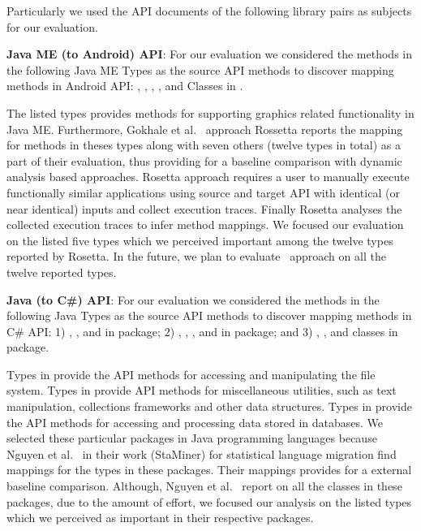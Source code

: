 Particularly we used the API documents of the following library pairs as subjects for our evaluation. 


\textbf{Java ME (to Android) API}:
For our evaluation we considered the methods in the following Java ME Types as the source API methods to discover mapping methods in Android API: 
,
,
,
, and
Classes in   .


The listed types provides methods for supporting graphics related functionality in Java ME.
Furthermore, Gokhale et al.~\cite{Gokhale2013ICSE} approach Rossetta reports the
mapping for methods in theses types along with seven others (twelve types in total) as a part of their evaluation,
thus providing for a baseline comparison with dynamic analysis based approaches.
Rosetta approach requires a user to manually execute functionally similar applications using source and target API with identical (or near identical) inputs and collect execution traces.
Finally Rosetta analyses the collected execution traces to infer method mappings.
We focused our evaluation on the listed five types which we perceived important among the twelve types reported by Rosetta.
In the future, we plan to evaluate \tool\ approach on all the twelve reported types. 

\textbf{Java (to C\#) API}:
For our evaluation we considered the methods in the following Java Types as the source API methods to discover mapping methods in C\# API: 
1) ,
, and 
 in  package;
2) ,
,
, and 
 in  package; and
3) ,
, and 
 classes in  package.
 
Types in  provide the API methods for accessing and manipulating the file system.
Types in  provide API methods for miscellaneous utilities, such as text manipulation, collections frameworks and other data structures.
Types in  provide the API methods for accessing and processing data stored in databases.
We selected these particular packages in Java programming languages because Nguyen et al.~\cite{nguyen2014statistical} in their work (StaMiner) for statistical language migration find mappings for the types in these packages.
Their mappings provides for a external baseline comparison.
Although, Nguyen et al.~\cite{nguyen2014statistical} report on all the classes in these packages,
due to the amount of effort, we focused our analysis on the listed types which we perceived as important in their respective packages.


